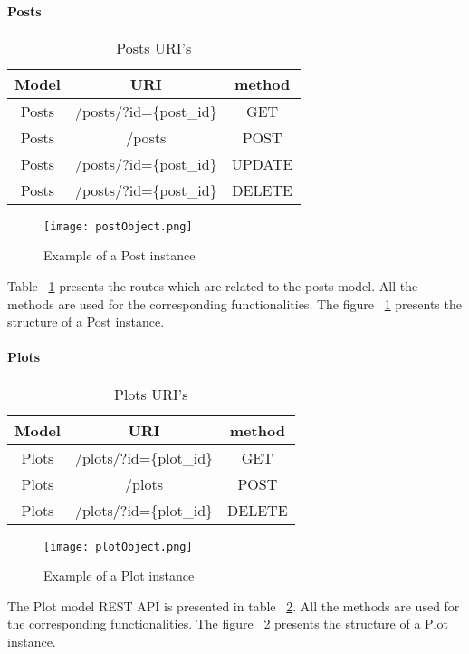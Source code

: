 \paragraph{Posts}
\begin{table}[]
\centering
\begin{tabular}{|c|c|c|}
\hline
\rowcolor[HTML]{32CB00} 
\textbf{Model} & \textbf{URI}            & \textbf{method} \\ \hline
\rowcolor[HTML]{FFFFFF} 
Posts          & /posts/?id=\{post\_id\} & GET             \\ \hline
\rowcolor[HTML]{67FD9A} 
Posts          & /posts                  & POST            \\ \hline
\rowcolor[HTML]{FFFFFF} 
Posts          & /posts/?id=\{post\_id\} & UPDATE          \\ \hline
\rowcolor[HTML]{67FD9A} 
Posts          & /posts/?id=\{post\_id\} & DELETE          \\ \hline
\end{tabular}
\caption{Posts URI's}
\label{postsURI}
\end{table}
\begin{figure}
	\centerline{\texttt{[image: postObject.png]}}
	\caption{Example of a Post instance}
	\label{postObject}
\end{figure}
Table ~\ref{postsURI} presents the routes which are related to the posts model. All the methods are used for the corresponding functionalities. The figure ~\ref{postObject} presents the structure of a Post instance. 

\paragraph{Plots}
\begin{table}[]
\centering
\begin{tabular}{|c|c|c|}
\hline
\rowcolor[HTML]{32CB00} 
\textbf{Model} & \textbf{URI}            & \textbf{method} \\ \hline
\rowcolor[HTML]{FFFFFF} 
Plots          & /plots/?id=\{plot\_id\} & GET             \\ \hline
\rowcolor[HTML]{67FD9A} 
Plots          & /plots                  & POST            \\ \hline
\rowcolor[HTML]{FFFFFF} 
Plots          & /plots/?id=\{plot\_id\} & DELETE          \\ \hline
\end{tabular}
\caption{Plots URI's}
\label{plotsURI}
\end{table}
\begin{figure}
	\centerline{\texttt{[image: plotObject.png]}}
	\caption{Example of a Plot instance}
	\label{plotObject}
\end{figure}
The Plot model REST API is presented in table ~\ref{plotsURI}. All the methods are used for the corresponding functionalities. The figure ~\ref{plotObject} presents the structure of a Plot instance. 


